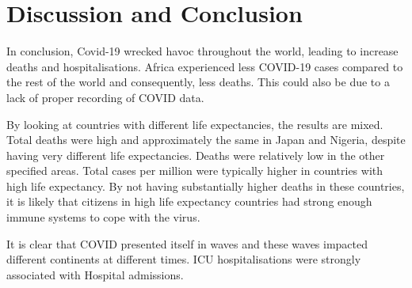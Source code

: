 \documentclass[11pt,preprint, authoryear]{elsarticle}
\numberwithin{equation}{section}
\numberwithin{figure}{section}
\numberwithin{table}{section}
\begin{document}
\hfill

\hypertarget{discussion-and-conclusion}{%
\section*{Discussion and Conclusion}\label{discussion-and-conclusion}}

In conclusion, Covid-19 wrecked havoc throughout the world, leading to
increase deaths and hospitalisations. Africa experienced less COVID-19
cases compared to the rest of the world and consequently, less deaths.
This could also be due to a lack of proper recording of COVID data.

By looking at countries with different life expectancies, the results
are mixed. Total deaths were high and approximately the same in Japan
and Nigeria, despite having very different life expectancies. Deaths
were relatively low in the other specified areas. Total cases per
million were typically higher in countries with high life expectancy. By
not having substantially higher deaths in these countries, it is likely
that citizens in high life expectancy countries had strong enough immune
systems to cope with the virus.

It is clear that COVID presented itself in waves and these waves
impacted different continents at different times. ICU hospitalisations
were strongly associated with Hospital admissions.

\newpage


\end{document}
